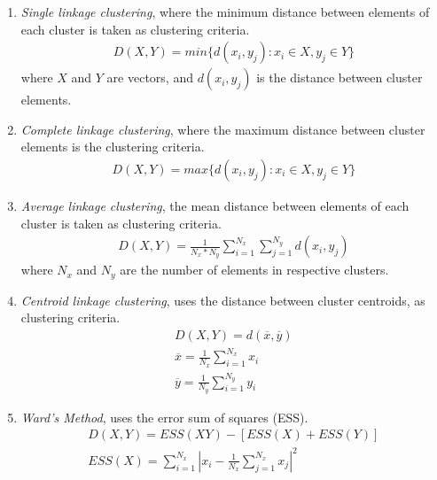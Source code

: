 \begin{enumerate}
\item{ \textit{Single linkage  clustering}, where the minimum distance
  between elements of each cluster is taken as clustering criteria.
\begin{gather}
D(X, Y)=min\{d(x_i, y_j): x_i \in X, y_j \in Y \}
\end{gather}
where  $X$ and  $Y$ are  vectors, and  $d(x_i, y_j)$  is  the distance
between cluster elements.  }

\item{  \textit{Complete   linkage  clustering},  where   the  maximum
  distance between cluster elements is the clustering criteria.
\begin{gather}
D(X, Y)=max\{d(x_i, y_j): x_i \in X, y_j \in Y \}
\end{gather} }

\item{ \textit{Average linkage  clustering}, the mean distance between
  elements of each cluster is taken as clustering criteria.
\begin{gather}
D(X, Y)=\frac{1}{N_x  * N_y} \sum_{i=1}^{N_x}  \sum_{j=1}^{N_y} d(x_i,
y_j)
\end{gather}
where  $N_x$  and $N_y$  are  the  number  of elements  in  respective
clusters.  }

\item{ \textit{Centroid linkage clustering}, uses the distance between
  cluster centroids, as clustering criteria.
\begin{gather}
D(X, Y)=d(\overline{x}, \overline{y})\\
\overline{x} = \frac{1}{N_x} \sum_{i=1}^{N_x} x_i\\
\overline{y} = \frac{1}{N_y} \sum_{i=1}^{N_y} y_i
\end{gather} }

\item{ \textit{Ward's  Method}, uses the  error sum of  squares (ESS).
\begin{gather}
D(X,Y)=ESS(XY) -[ESS(X) + ESS(Y)]\\
ESS(X)=  \sum_{i=1}^{N_x} \left|
x_i -\frac{1}{N_x}\sum_{j=1}^{N_x} x_j\right|^2
\end{gather} }
\end{enumerate}

